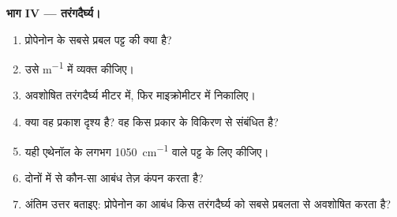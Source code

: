 \begin{problem}
\medskip
\noindent\textbf{भाग IV --- तरंगदैर्घ्य।}
\begin{enumerate}[resume]
  \item प्रोपेनोन के सबसे प्रबल पट्ट की  क्या है?
  \item उसे \si{m^{-1}} में व्यक्त कीजिए।
  \item अवशोषित तरंगदैर्घ्य मीटर में, फिर
        माइक्रोमीटर में निकालिए।
  \item क्या वह प्रकाश दृश्य है? वह किस प्रकार के विकिरण से
        संबंधित है?
  \item यही एथेनॉल के लगभग \qty{1050}{cm^{-1}} वाले  पट्ट के लिए
        कीजिए।
  \item दोनों में से कौन-सा आबंध तेज़ कंपन करता है?
  \item अंतिम उत्तर बताइए: प्रोपेनोन का  आबंध किस तरंगदैर्घ्य को
        सबसे प्रबलता से अवशोषित करता है?
\end{enumerate}
\end{problem}
